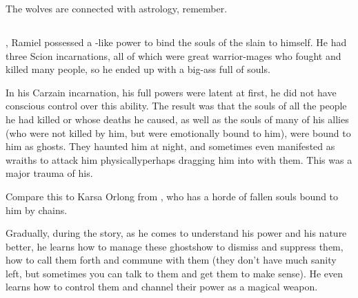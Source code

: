 
The wolves are connected with astrology, remember. 








\subsection{\Carcer}
, Ramiel possessed a \sephirah-like power to bind the souls of the slain to himself. 
He had three Scion incarnations, all of which were great warrior-mages who fought and killed many people, so he ended up with a big-ass \carcer{} full of souls. 

In his Carzain incarnation, his full \Malach{} powers were latent at first, he did not have conscious control over this ability. 
The result was that the souls of all the people he had killed or whose deaths he caused, as well as the souls of many of his allies (who were not killed by him, but were emotionally bound to him), were bound to him as ghosts. 
They haunted him at night, and sometimes even manifested as wraiths to attack him physically\dash perhaps dragging him into \Nyx{} with them. 
This was a major trauma of his. 

Compare this to Karsa Orlong from \cite{StevenEriksonIanCameronEsslemont:MalazanBookoftheFallen}, who has a horde of fallen souls bound to him by chains.

Gradually, during the story, as he comes to understand his power and his nature better, he learns how to manage these ghosts\dash how to dismiss and suppress them, how to call them forth and commune with them (they don't have much sanity left, but sometimes you can talk to them and get them to make sense). 
He even learns how to control them and channel their power as a magical weapon. 

